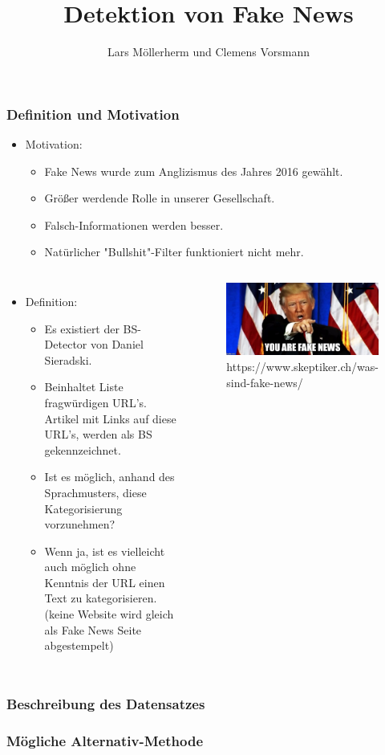 \documentclass[aspectratio=1610, professionalfonts, 9pt]{beamer}
\title{Detektion von Fake News}
\author{Lars Möllerherm und Clemens Vorsmann}
\institute{Fakultät Physik}
\begin{document}
  \begin{frame}
    \titlepage
  \end{frame}

  \begin{frame}
    \frametitle{Definition und Motivation}
    \begin{itemize}
      \item Motivation:
      \begin{itemize}
        \item Fake News wurde zum Anglizismus des Jahres 2016 gewählt\cite{angli}.
        \item Größer werdende Rolle in unserer Gesellschaft.
        \item Falsch-Informationen werden besser.
        \item Natürlicher "Bullshit"-Filter funktioniert nicht mehr.
      \end{itemize}
    \end{itemize}
    \begin{columns}
      \begin{itemize}
        \item Definition:
        \begin{itemize}
        \item Es existiert der BS-Detector von Daniel Sieradski\cite{BS}.
        \item Beinhaltet Liste fragwürdigen URL's. Artikel mit Links auf diese URL's, 
            werden als BS gekennzeichnet.
        \item Ist es möglich, anhand des Sprachmusters, diese Kategorisierung vorzunehmen?
        \item Wenn ja, ist es vielleicht auch möglich ohne Kenntnis der URL einen Text zu kategorisieren. 
            (keine Website wird gleich als Fake News Seite abgestempelt)
        \end{itemize}
      \end{itemize}
      \begin{figure}
          \includegraphics[width=\textwidth]{pictures/trump-fake-news.jpg}
          \caption{https://www.skeptiker.ch/was-sind-fake-news/}
          \label{}
        \end{figure}
      \end{columns}
  \end{frame}

  \begin{frame}
    \frametitle{Beschreibung des Datensatzes}
  \end{frame}

  \begin{frame}
    \frametitle{Mögliche Alternativ-Methode}
  \end{frame}
\end{document}
